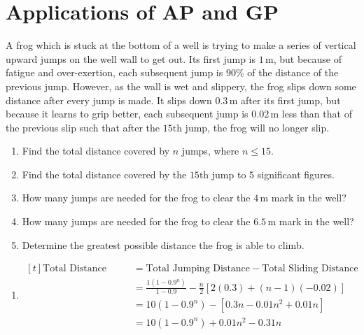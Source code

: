 \documentclass[11pt,a4paper]{book}
\begin{document}
\newpage

\section{Applications of AP and GP}

\begin{example}

A frog which is stuck at the bottom of a well is trying to make a
series of vertical upward jumps on the well wall to get out. Its first
jump is $1\,\text{m}$, but because of fatigue and over-exertion,
each subsequent jump is $90\%$ of the distance of the previous jump. However, as the wall is wet and slippery, the frog slips down some distance after every jump is made. It slips down $0.3\,\text{m}$ after its first jump, but because it learns to grip better, each subsequent jump is $0.02\,\text{m}$ less than that of the previous slip such that after the $15\text{th}$ jump, the frog will no longer slip.

\begin{enumerate}[label=(\alph*)]

\item  Find the total distance covered by $n$ jumps, where $n\leq15$.

\item  Find the total distance covered by the $15\text{th}$ jump
to $5$ significant figures.

\item  How many jumps are needed for the frog to clear the $4\,\text{m}$ mark in the well?

\item  How many jumps are needed for the frog to clear the $6.5\,\text{m}$ mark in the well?

\item  Determine the greatest possible distance the frog is able
to climb.

\end{enumerate}

\Solution

\begin{enumerate}[label=(\alph*)]

\item
$
\begin{aligned}[t]
\text{Total Distance Covered} & =\text{Total Jumping Distance}-\text{Total Sliding Distance}\\
 & =\frac{1\left(1-0.9^{n}\right)}{1-0.9}-\frac{n}{2}\left[2\left(0.3\right)+\left(n-1\right)\left(-0.02\right)\right]\\
 & =10\left(1-0.9^{n}\right)-\left[0.3n-0.01n^{2}+0.01n\right]\\
 & =10\left(1-0.9^{n}\right)+0.01n^{2}-0.31n
\end{aligned}
$


\end{enumerate}
\end{example}
\end{document}
